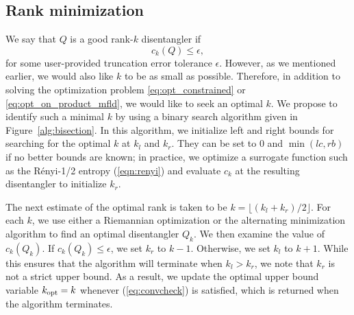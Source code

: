 \documentclass[pdflatex,sn-mathphys-num]{sn-jnl}
\newcounter{thm}[section]
\begin{document}
\subsection{Rank minimization}
We say that $Q$ is a good rank-$k$ disentangler if 
\begin{equation}
c_k(Q) \le \epsilon,
\label{eq:convcheck}
\end{equation}
for some user-provided truncation error tolerance $\epsilon$. However, as we mentioned earlier, we would also like $k$ to be as small as possible. Therefore, in addition to solving the optimization problem \eqref{eq:opt_constrained} or \eqref{eq:opt_on_product_mfld}, we would like to seek an optimal $k$. We propose to identify such a minimal $k$ by using a binary search algorithm given in Figure~\ref{alg:bisection}.
In this algorithm, we initialize left and right bounds for searching for the optimal $k$ at $k_l$ and $k_r$. They can be set to $0$ and $\min(lc, rb)$ if no better bounds are known; in practice, we optimize a surrogate function such as the R\'{e}nyi-1/2 entropy (\ref{eqn:renyi}) and evaluate $c_k$ at the resulting disentangler to initialize $k_r$. 

The next estimate of the optimal rank is taken to be $k=\lfloor(k_l+k_r)/2\rfloor$. For each $k$, we use either a Riemannian optimization or the alternating minimization algorithm to find an optimal disentangler $Q_k$. We then examine the value of $c_k(Q_k)$. If $c_k(Q_k) \leq \epsilon$, we set $k_r$ to $k-1$. Otherwise, we set $k_l$ to $k+1$. While this ensures that the algorithm will terminate when $k_l > k_r$, we note that $k_r$ is not a strict upper bound. As a result, we update the optimal upper bound variable $k_{\rm opt}=k$ whenever (\ref{eq:convcheck}) is satisfied, which is returned when the algorithm terminates. 
\end{document}

